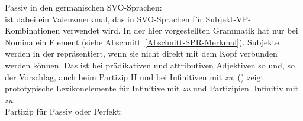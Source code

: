 {    
\ex Passiv in den germanischen SVO-Sprachen:\\
\zl
\spr ist dabei ein Valenzmerkmal, das in SVO-Sprachen für Subjekt-VP-Kombinationen verwendet
wird. In der hier vorgestellten Grammatik hat \spr nur bei Nomina ein Element (siehe
Abschnitt~\ref{Abschnitt-SPR-Merkmal}). Subjekte werden in der \subjl repräsentiert, wenn sie nicht
direkt mit dem Kopf verbunden werden können. Das ist \zb bei prädikativen und attributiven
Adjektiven so und, so der Vorschlag, auch beim Partizip II und bei Infinitiven mit \emph{zu}. () zeigt prototypische
Lexikonelemente für Infinitive mit \emph{zu} und Partizipien.
\largerpage
\eal
\label{ex-inf-pppARG-ST}
\ex 
\label{ex-inf-zu-mapping-ARGST}%
Infinitiv mit \emph{zu}:\\
\ex 
\label{ex-ppp-mapping-ARGST}%
Partizip für Passiv oder Perfekt:\\
\zl

}
